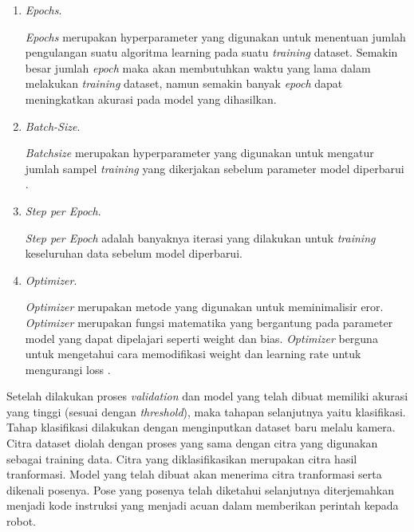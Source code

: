 \begin{enumerate}
  \item \emph{Epochs}. \par
  \emph{Epochs} merupakan hyperparameter yang digunakan untuk menentuan jumlah pengulangan suatu algoritma learning pada suatu \emph{training} dataset. Semakin besar jumlah \emph{epoch} maka akan membutuhkan waktu yang lama dalam melakukan \emph{training} dataset, namun semakin banyak \emph{epoch} dapat meningkatkan akurasi pada model yang dihasilkan.
  \item \emph{Batch-Size}. \par
  \emph{Batchsize} merupakan hyperparameter yang digunakan untuk mengatur jumlah sampel \emph{training} yang dikerjakan sebelum parameter model diperbarui \parencite{batchsize}.
  \item \emph{Step per Epoch}. \par
  \emph{Step per Epoch} adalah banyaknya iterasi yang dilakukan untuk \emph{training} keseluruhan data sebelum model diperbarui.
  \item \emph{Optimizer}. \par
  \emph{Optimizer} merupakan metode yang digunakan untuk meminimalisir eror. \emph{Optimizer} merupakan fungsi matematika yang bergantung pada parameter model yang dapat dipelajari seperti weight dan bias. \emph{Optimizer} berguna untuk mengetahui cara memodifikasi weight dan learning rate untuk mengurangi loss \parencite{optimizer}.
\end{enumerate} 
Setelah dilakukan proses \emph{validation} dan model yang telah dibuat memiliki akurasi yang tinggi (sesuai dengan \emph{threshold}), maka tahapan selanjutnya yaitu klasifikasi. Tahap klasifikasi dilakukan dengan menginputkan dataset baru melalu kamera. Citra dataset diolah dengan proses yang sama dengan citra yang digunakan sebagai training data. Citra yang diklasifikasikan merupakan citra hasil tranformasi. Model yang telah dibuat akan menerima citra tranformasi serta dikenali posenya. Pose yang posenya telah diketahui selanjutnya diterjemahkan menjadi kode instruksi yang menjadi acuan dalam memberikan perintah kepada robot.


